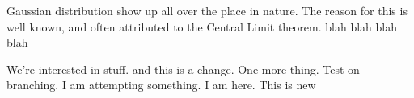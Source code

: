 Gaussian distribution show up all over the place in nature.
The reason for this is well known,
and often attributed to the Central Limit theorem. blah blah blah blah
\cite{clt} \cite{clt2}

We're interested in stuff. and this is a change. One more thing. Test on
branching. I am attempting something. I am here. This is new
